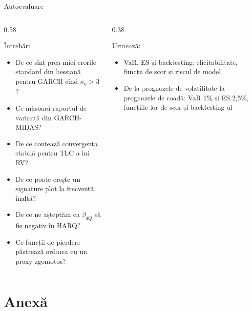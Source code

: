 \begin{frame}{Autoevaluare}
\itemsize{\small}
\begin{columns}[T]
\begin{column}{0.58\textwidth}
\begin{block}{Întrebări}
\begin{itemize}
    \item De ce sînt prea mici erorile standard din hessiană pentru GARCH cînd $\kappa_\eta > 3$?
    \item Ce măsoară raportul de varianță din GARCH-MIDAS?
    \item De ce contează convergența stabilă pentru TLC a lui RV?
    \item De ce poate crește un signature plot la frecvență înaltă?
    \item De ce ne așteptăm ca $\beta_{dQ}$ să fie negativ în HARQ?
    \item Ce funcții de pierdere păstrează ordinea cu un proxy zgomotos?
\end{itemize}
\end{block}
\end{column}
\begin{column}{0.38\textwidth}
\begin{block}{Urmează: }
\begin{itemize}
    \item VaR, ES și backtesting: elicitabilitate, funcții de scor și riscul de model
    \item De la prognozele de volatilitate la prognozele de coadă: VaR 1\% și ES 2,5\%, funcțiile lor de scor și backtesting-ul
\end{itemize}
\end{block}
\end{column}
\end{columns}
\end{frame}


\section{Anexă}


